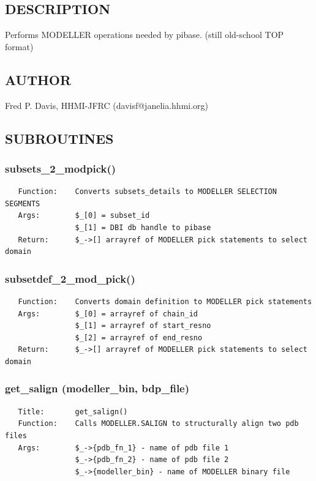 \documentclass{article}
\begin{document}
\subsection*{DESCRIPTION\label{pibase::modeller_DESCRIPTION}}


Performs MODELLER operations needed by pibase. (still old-school TOP format)

\subsection*{AUTHOR\label{pibase::modeller_AUTHOR}}


Fred P. Davis, HHMI-JFRC (davisf@janelia.hhmi.org)

\subsection*{SUBROUTINES\label{pibase::modeller_SUBROUTINES}}
\subsubsection*{subsets\_2\_modpick()\label{pibase::modeller_subsets_2_modpick_}}
\begin{verbatim}
   Function:    Converts subsets_details to MODELLER SELECTION SEGMENTS
   Args:        $_[0] = subset_id
                $_[1] = DBI db handle to pibase
   Return:      $_->[] arrayref of MODELLER pick statements to select domain
\end{verbatim}
\subsubsection*{subsetdef\_2\_mod\_pick()\label{pibase::modeller_subsetdef_2_mod_pick_}}
\begin{verbatim}
   Function:    Converts domain definition to MODELLER pick statements
   Args:        $_[0] = arrayref of chain_id
                $_[1] = arrayref of start_resno
                $_[2] = arrayref of end_resno
   Return:      $_->[] arrayref of MODELLER pick statements to select domain
\end{verbatim}
\subsubsection*{get\_salign (modeller\_bin, bdp\_file)\label{pibase::modeller_get_salign_modeller_bin_bdp_file_}}
\begin{verbatim}
   Title:       get_salign()
   Function:    Calls MODELLER.SALIGN to structurally align two pdb files
   Args:        $_->{pdb_fn_1} - name of pdb file 1
                $_->{pdb_fn_2} - name of pdb file 2
                $_->{modeller_bin} - name of MODELLER binary file
\end{verbatim}
\end{document}
